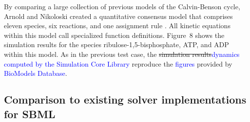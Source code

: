 \documentclass[10pt]{bmc_article}
\newenvironment{bmcformat}{\fussy\setboolean{publ}{true}}{\fussy}
\newcommand{\COR}[1]                      {\textcolor{blue}{#1}}
\begin{document}
\begin{bmcformat}
By comparing a large collection of previous models of the Calvin-Benson
cycle, Arnold and Nikoloski created a quantitative consensus model that
comprises eleven species, six reactions, and one assignment rule
\cite{Arnold2011}.
All kinetic equations within this model call specialized function definitions.
Figure~8 shows the simulation results for the species ribulose-1,5-bisphosphate,
\acs{ATP}, and \acs{ADP} within this model.
As in the previous test case, the
\sout{simulation results}\COR{dynamics computed by the Simulation Core Library}
reproduce the \COR{figures} provided by \COR{BioModels Database}.  

\subsection*{Comparison to existing solver implementations for SBML}


\end{bmcformat}
\end{document}
